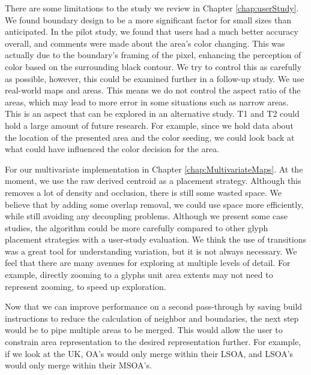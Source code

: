 There are some limitations to the study we review in Chapter \ref{chap:userStudy}. We found boundary design to be a more significant factor for small sizes than anticipated. In the pilot study, we found that users had a much better accuracy overall, and comments were made about the area's color changing. This was actually due to the boundary's framing of the pixel, enhancing the perception of color based on the surrounding black contour. We try to control this as carefully as possible, however, this could be examined further in a follow-up study. We use real-world maps and areas. This means we do not control the aspect ratio of the areas, which may lead to more error in some situations such as narrow areas. This is an aspect that can be explored in an alternative study. T1 and T2 could hold a large amount of future research. For example, since we hold data about the location of the presented area and the color seeding, we could look back at what could have influenced the color decision for the area.

For our multivariate implementation in Chapter \ref{chap:MultivariateMaps}. At the moment, we use the raw derived centroid as a placement strategy. Although this removes a lot of density and occlusion, there is still some wasted space. We believe that by adding some overlap removal, we could use space more efficiently, while still avoiding any decoupling problems. Although we present some case studies, the algorithm could be more carefully compared to other glyph placement strategies with a user-study evaluation. We think the use of transitions was a great tool for understanding variation, but it is not always necessary. We feel that there are many avenues for exploring at multiple levels of detail. For example, directly zooming to a glyphs unit area extents may not need to represent zooming, to speed up exploration.

Now that we can improve performance on a second pass-through by saving build instructions to reduce the calculation of neighbor and boundaries, the next step would be to pipe multiple areas to be merged. This would allow the user to constrain area representation to the desired representation further. For example, if we look at the UK, OA's would only merge within their LSOA, and LSOA's would only merge within their MSOA's.
